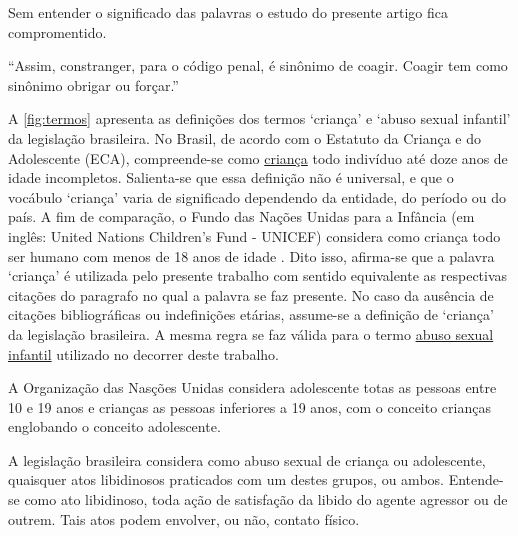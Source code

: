 
Sem entender o significado das palavras o estudo do presente artigo fica compromentido. 

``Assim, constranger, para o código penal, é sinônimo de coagir. Coagir tem como sinônimo obrigar ou forçar.''

A \autoref{fig:termos} apresenta as definições dos termos `criança' e `abuso sexual infantil' da legislação brasileira. No Brasil, de acordo com o Estatuto da Criança e do Adolescente (ECA), compreende-se como \underline{criança} todo indivíduo até doze anos de idade incompletos. Salienta-se que essa definição não é universal, e que o vocábulo `criança' varia de significado dependendo da entidade, do período ou do país. A fim de comparação, o Fundo das Nações Unidas para a Infância (em inglês: United Nations Children’s Fund - UNICEF) considera como criança todo ser humano com menos de 18 anos de idade \cite{brasil1988convenccao}. Dito isso, afirma-se que a palavra `criança' é utilizada pelo presente trabalho com sentido equivalente as respectivas citações do paragrafo no qual a palavra se faz presente. No caso da ausência de citações bibliográficas ou indefinições etárias, assume-se a definição de `criança' da legislação brasileira. A mesma regra se faz válida para o termo \underline{abuso sexual infantil} utilizado no decorrer deste trabalho.


A Organização das Nasções Unidas considera adolescente totas as pessoas entre 10 e 19 anos e crianças as pessoas inferiores a 19 anos, com o conceito crianças englobando o conceito adolescente. 

A legislação brasileira considera como abuso sexual de criança ou adolescente, quaisquer atos libidinosos praticados com um destes grupos, ou ambos. Entende-se como ato libidinoso, toda ação de satisfação da libido do agente agressor ou de outrem. Tais atos podem envolver, ou não, contato físico. 



\newcommand\x{2.8 cm}
\newcommand\y{1.5 cm}
\newcommand\z{13 cm}

